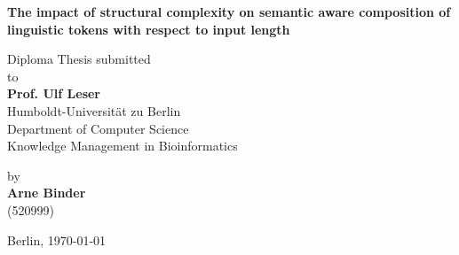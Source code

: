 \begin{center}

    {\Large{\bf The impact of structural complexity on semantic aware composition of linguistic tokens with respect to input length}} \vspace{0.5cm}


    {\normalsize Diploma Thesis submitted\\\vspace{0.5cm}
    to}\\\vspace{0.5cm}
    {\normalsize{\bf Prof. Ulf Leser}} \\\vspace{0.5cm}
    {\normalsize Humboldt-Universität zu Berlin \\
    Department of Computer Science \\
    Knowledge Management in Bioinformatics} \vspace{1cm}


    {\normalsize by \\\vspace{0.5cm}
    {\bf Arne Binder} \\
    (520999)} \vspace{1cm}


    {\normalsize Berlin, \today}

\end{center}
